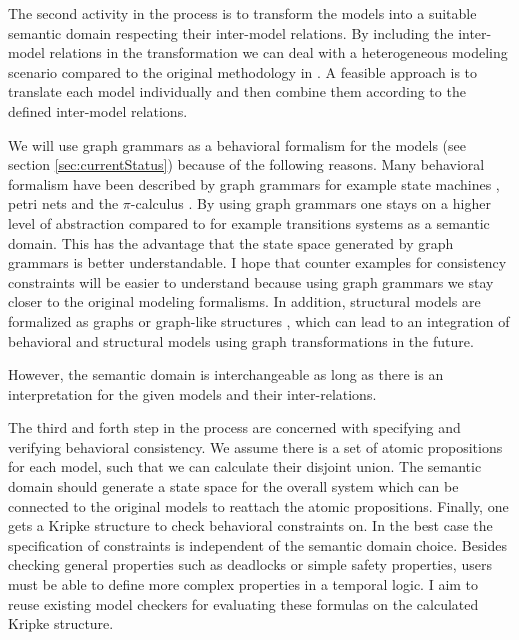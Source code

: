 \documentclass[conference]{IEEEtran}
\begin{document}
The second activity in the process is to transform the models into a suitable semantic domain respecting their inter-model relations.
By including the inter-model relations in the transformation we can deal with a heterogeneous modeling scenario compared to the original methodology in \cite{engelsMethodologySpecifyingAnalyzing2001}.
A feasible approach is to translate each model individually and then combine them according to the defined inter-model relations.

We will use graph grammars as a behavioral formalism for the models (see section \ref{sec:currentStatus}) because of the following reasons.
Many behavioral formalism have been described by graph grammars for example state machines \cite{kuskeFormalSemanticsUML2001, varroFormalSemanticsUML2002}, petri nets \cite{ehrigGraphGrammarsPetri2004} and the $\pi$-calculus \cite{gadducciGraphRewritingPcalculus2007}.
By using graph grammars one stays on a higher level of abstraction compared to for example transitions systems as a semantic domain.
This has the advantage that the state space generated by graph grammars is better understandable.
I hope that counter examples for consistency constraints will be easier to understand because using graph grammars we stay closer to the original modeling formalisms.
In addition, structural models are formalized as graphs or graph-like structures \cite{stunkelMultipleModelSynchronization2020}, which can lead to an integration of behavioral and structural models using graph transformations in the future. 

However, the semantic domain is interchangeable as long as there is an interpretation for the given models and their inter-relations.

The third and forth step in the process are concerned with specifying and verifying behavioral consistency.
We assume there is a set of atomic propositions for each model, such that we can calculate their disjoint union.
The semantic domain should generate a state space for the overall system which can be connected to the original models to reattach the atomic propositions.
Finally, one gets a Kripke structure to check behavioral constraints on.
In the best case the specification of constraints is independent of the semantic domain choice.
Besides checking general properties such as deadlocks or simple safety properties, users must be able to define more complex properties in a temporal logic.
I aim to reuse existing model checkers for evaluating these formulas on the calculated Kripke structure.
\end{document}
